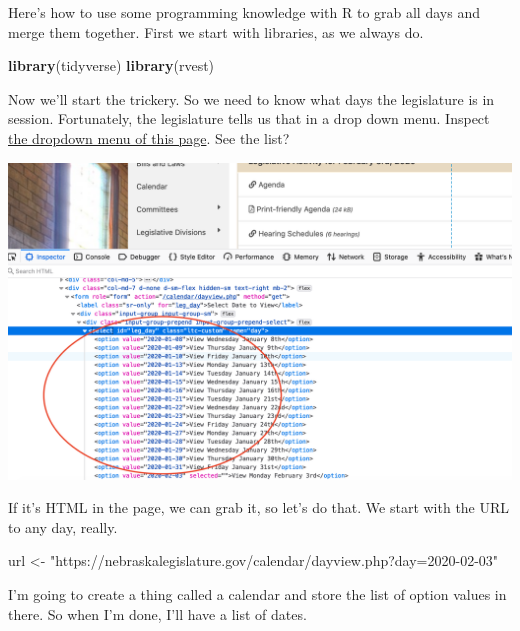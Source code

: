 \documentclass[]{book}
\newenvironment{Shaded}{\begin{snugshade}}{\end{snugshade}}
\newcommand{\DataTypeTok}[1]{\textcolor[rgb]{0.13,0.29,0.53}{#1}}
\newcommand{\KeywordTok}[1]{\textcolor[rgb]{0.13,0.29,0.53}{\textbf{#1}}}
\newcommand{\NormalTok}[1]{#1}
\newcommand{\OperatorTok}[1]{\textcolor[rgb]{0.81,0.36,0.00}{\textbf{#1}}}
\newcommand{\StringTok}[1]{\textcolor[rgb]{0.31,0.60,0.02}{#1}}
\begin{document}
Here's how to use some programming knowledge with R to grab all days and merge them together. First we start with libraries, as we always do.

\begin{Shaded}
\begin{Highlighting}[]
\KeywordTok{library}\NormalTok{(tidyverse)}
\KeywordTok{library}\NormalTok{(rvest)}
\end{Highlighting}
\end{Shaded}

Now we'll start the trickery. So we need to know what days the legislature is in session. Fortunately, the legislature tells us that in a drop down menu. Inspect \href{https://nebraskalegislature.gov/calendar/dayview.php?day=2020-02-03}{the dropdown menu of this page}. See the list?

\includegraphics[width=26.28in]{images/advrvest1}

If it's HTML in the page, we can grab it, so let's do that. We start with the URL to any day, really.

\begin{Shaded}
\begin{Highlighting}[]
\NormalTok{url <-}\StringTok{ "https://nebraskalegislature.gov/calendar/dayview.php?day=2020-02-03"}
\end{Highlighting}
\end{Shaded}

I'm going to create a thing called a calendar and store the list of option values in there. So when I'm done, I'll have a list of dates.

\begin{Shaded}
\end{Shaded}
\end{document}
